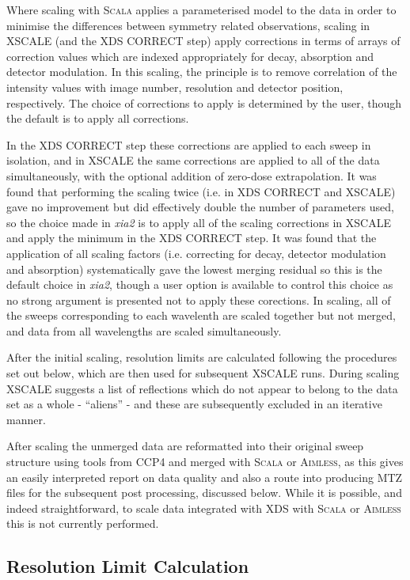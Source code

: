 \documentclass[preprint,pdf]{iucr}
\begin{document}
Where scaling with \textsc{Scala} applies a parameterised model to the data
in order to minimise the differences between symmetry related
observations, scaling in XSCALE (and the XDS CORRECT step) apply
corrections in terms of arrays of correction values which are indexed
appropriately for decay, absorption and detector modulation. In this
scaling, the principle is to remove correlation of the intensity values
with image number, resolution and detector position, 
respectively. The choice of corrections to apply
is determined by the user, though the default is to apply all corrections.

In the XDS CORRECT step these corrections are applied to each sweep in
isolation, and in XSCALE the same corrections are applied to all of the
data simultaneously, with the optional addition of zero-dose extrapolation. 
It was found that performing the scaling twice (i.e. in XDS CORRECT
and XSCALE)
gave no improvement but did effectively double the number of
parameters used, so the choice made in \emph{xia2} is to apply all of
the scaling corrections in XSCALE and apply the minimum in the XDS
CORRECT step. It was found that the application of all scaling factors
(i.e. correcting for decay, detector modulation and absorption)
systematically gave the lowest merging residual so this is the
default choice in \emph{xia2}, though a user option is available to
control this choice as no strong argument is presented not to apply
these corections. In scaling, all of the sweeps corresponding to
each wavelenth are scaled together but not merged, and
data from all wavelengths are scaled simultaneously. 

After the initial scaling, resolution limits are calculated
following the procedures set out below, which are then used for subsequent
XSCALE runs. During scaling XSCALE suggests a
list of reflections which do not appear to belong to the data set as a
whole - ``aliens'' - and these are subsequently excluded in an iterative manner.

After scaling the unmerged data are reformatted into their original
sweep structure using tools from CCP4
and merged with \textsc{Scala} or \textsc{Aimless}, as this gives an
easily interpreted report on data quality and also a route into
producing MTZ files for the subsequent post processing, discussed
below. While it is possible, and indeed straightforward, to scale data
integrated with XDS with \textsc{Scala} or \textsc{Aimless} this is
not currently performed.

\subsection{Resolution Limit Calculation}
\end{document}
